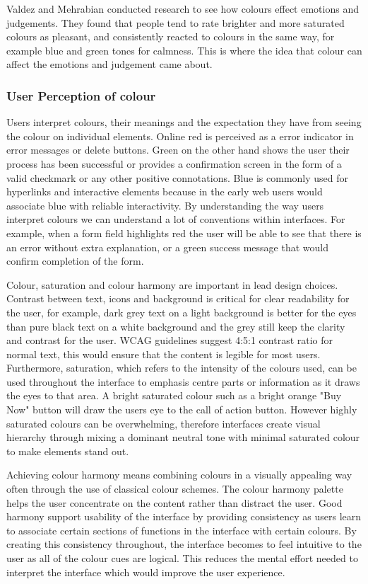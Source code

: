 \documentclass[]{project_final}
\begin{document}
Valdez and Mehrabian conducted research to see how colours effect emotions and judgements. They found that people tend to rate brighter and more saturated colours as pleasant, and consistently reacted to colours in the same way, for example blue and green tones for calmness. This is where the idea that colour can affect the emotions and judgement came about.


\subsubsection{User Perception of colour}

Users interpret colours, their meanings and the expectation they have from seeing the colour on individual elements. Online red is perceived as a error indicator in error messages or delete buttons. Green on the other hand shows the user their process has been successful or provides a confirmation screen in the form of a valid checkmark or any other positive connotations. Blue is commonly used for hyperlinks and interactive elements because in the early web users would associate blue with reliable interactivity. By understanding the way users interpret colours we can understand a lot of conventions within interfaces. For example, when a form field highlights red the user will be able to see that there is an error without extra explanation, or a green success message that would confirm completion of the form.

Colour, saturation and colour harmony are important in lead design choices. Contrast between text, icons and background is critical for clear readability for the user, for example, dark grey text on a light background is better for the eyes than pure black text on a white background and the grey still keep the clarity and contrast for the user. WCAG guidelines suggest 4:5:1 contrast ratio for normal text, this would ensure that the content is legible for most users. Furthermore, saturation, which refers to the intensity of the colours used, can be used throughout the interface to emphasis centre parts or information as it draws the eyes to that area. A bright saturated colour such as a bright orange "Buy Now" button will draw the users eye to the call of action button. However highly saturated colours can be overwhelming, therefore interfaces create visual hierarchy through mixing a dominant neutral tone with minimal saturated colour to make elements stand out.

Achieving colour harmony means combining colours in a visually appealing way often through the use of classical colour schemes. The colour harmony palette helps the user concentrate on the content rather than distract the user. Good harmony support usability of the interface by providing consistency as users learn to associate certain sections of functions in the interface with certain colours. By creating this consistency throughout, the interface becomes to feel intuitive to the user as all of the colour cues are logical. This reduces the mental effort needed to interpret the interface which would improve the user experience.
\end{document}
